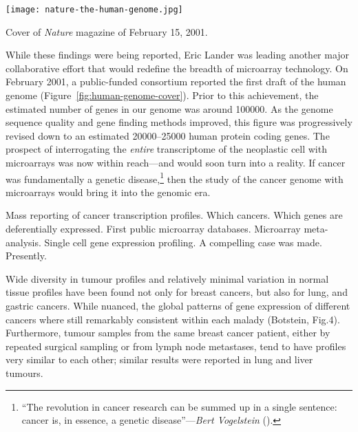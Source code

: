 
\begin{marginfigure}%
  \texttt{[image: nature-the-human-genome.jpg]}
  \caption{Cover of \emph{Nature} magazine of February 15, 2001.}
  \label{fig:human-genome-cover}
\end{marginfigure}

While these findings were being reported, Eric Lander was leading another major
collaborative effort that would redefine the breadth of microarray technology.
On February 2001, a \mbox{public-funded} consortium reported the first draft of
the human genome (Figure~\ref{fig:human-genome-cover}).  Prior to this
achievement, the estimated number of genes in our genome was around
\num{100000}.\cite{cox_assessing_1994} As the genome sequence quality and gene
finding methods improved, this figure was progressively revised down to an
estimated \num{20000}--\num{25000} human protein coding genes.  The prospect of
interrogating the \emph{entire} transcriptome of the neoplastic cell with
microarrays was now within reach---and would soon turn into a reality.  If
cancer was fundamentally a genetic disease,\footnote{``The revolution in cancer
  research can be summed up in a single sentence: cancer is, in essence, a
  genetic disease''---\emph{Bert Vogelstein}
  (\citealp{vogelstein_cancer_2004}).} then the study of the cancer genome with
microarrays would bring it into the genomic era.

Mass reporting of cancer transcription profiles.  Which cancers.  Which genes
are deferentially expressed.  First public microarray databases.  Microarray
meta-analysis.  Single cell gene expression profiling.  A compelling case was
made.  Presently.

Wide diversity in tumour profiles and relatively minimal variation in normal
tissue profiles have been found not only for breast cancers, but also for lung,
and gastric cancers.  While nuanced, the global patterns of gene expression of
different cancers where still remarkably consistent within each malady
(Botstein, Fig.4).  Furthermore, tumour samples from the same breast cancer
patient, either by repeated surgical sampling or from lymph node metastases,
tend to have profiles very similar to each other; similar results were reported
in lung and liver tumours.

